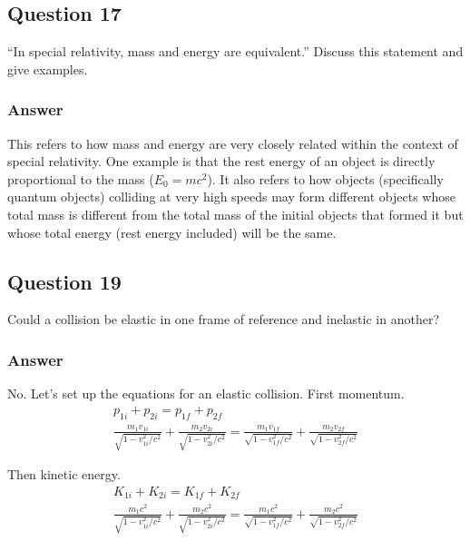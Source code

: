 \documentclass[12pt]{article}
\begin{document}
    \subsection{Question 17}
        ``In special relativity, mass and energy are equivalent.''
        Discuss this statement and give examples.

        \subsubsection{Answer}
            This refers to how mass and energy are very closely related within the context of special relativity.
            One example is that the rest energy of an object is directly proportional to the mass ($E_0 = mc^2$).
            It also refers to how objects (specifically quantum objects) colliding at very high speeds may form different objects whose total mass is different from the total mass of the initial objects that formed it but whose total energy (rest energy included) will be the same.

    \subsection{Question 19}
        Could a collision be elastic in one frame of reference and inelastic in another?

        \subsubsection{Answer}
            No.
            Let's set up the equations for an elastic collision.
            First momentum.
            \begin{gather}
                p_{1i} + p_{2i} = p_{1f} + p_{2f}\\
                \frac{m_1 v_{1i}}{\sqrt{1 - v_{1i}^2/c^2}} + \frac{m_2 v_{2i}}{\sqrt{1 - v_{2i}^2/c^2}} = \frac{m_1 v_{1f}}{\sqrt{1 - v_{1f}^2/c^2}} + \frac{m_2 v_{2f}}{\sqrt{1 - v_{2f}^2/c^2}}
            \end{gather}

            Then kinetic energy.
            \begin{gather}
                K_{1i} + K_{2i} = K_{1f} + K_{2f}\\
                \frac{m_1 c^2}{\sqrt{1 - v_{1i}^2/c^2}} + \frac{m_2 c^2}{\sqrt{1 - v_{2i}^2/c^2}} = \frac{m_1 c^2}{\sqrt{1 - v_{1f}^2/c^2}} + \frac{m_2 c^2}{\sqrt{1 - v_{2f}^2/c^2}}
            \end{gather}
\end{document}
